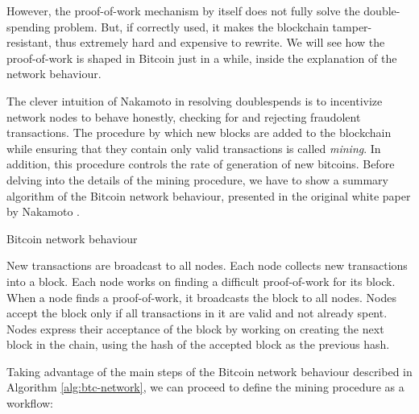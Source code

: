 \bigskip
\noindent
However, the proof-of-work mechanism by itself does not fully solve the double-spending problem. But, if correctly used, it makes the blockchain tamper-resistant, thus extremely hard and expensive to rewrite. We will see how the proof-of-work is shaped in Bitcoin just in a while, inside the explanation of the network behaviour.

\bigskip
\noindent
The clever intuition of Nakamoto in resolving doublespends is to incentivize network nodes to behave honestly, checking for and rejecting fraudolent transactions. The procedure by which new blocks are added to the blockchain while ensuring that they contain only valid transactions is called \textit{mining}. In addition, this procedure controls the rate of generation of new bitcoins. Before delving into the details of the mining procedure, we have to show a summary algorithm of the Bitcoin network behaviour, presented in the original white paper by Nakamoto \cite{nakamoto2012bitcoin}.

\begin{algorithm}
	\caption{Bitcoin network behaviour}
	\label{alg:btc-network}
	\begin{algorithmic}[1]
		\State New transactions are broadcast to all nodes.
		\State Each node collects new transactions into a block.
		\State Each node works on finding a difficult proof-of-work for its block.
		\State When a node finds a proof-of-work, it broadcasts the block to all nodes.
		\State Nodes accept the block only if all transactions in it are valid and not already spent.
		\State  Nodes express their acceptance of the block by working on creating the next block in the chain, using the hash of the accepted block as the previous hash.
	\end{algorithmic}
\end{algorithm}

\bigskip
\noindent
Taking advantage of the main steps of the Bitcoin network behaviour described in Algorithm \ref{alg:btc-network}, we can proceed to define the mining procedure as a workflow:


